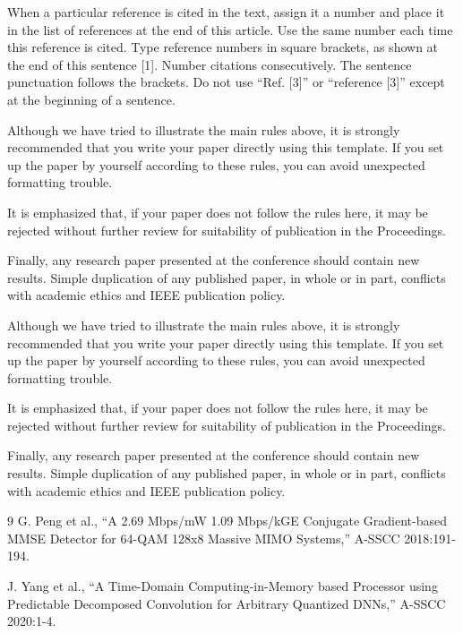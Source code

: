 \documentclass{asscc2026}
\begin{document}
When a particular reference is cited in the text, assign it a number and place it in the list of references at the end of this article. Use the same number each time this reference is cited. Type reference numbers in square brackets, as shown at the end of this sentence [1]. Number citations consecutively. The sentence punctuation follows the brackets. Do not use ``Ref. [3]'' or ``reference [3]'' except at the beginning of a sentence.

Although we have tried to illustrate the main rules above, it is strongly recommended that you write your paper directly using this template. If you set up the paper by yourself according to these rules, you can avoid unexpected formatting trouble.

It is emphasized that, if your paper does not follow the rules here, it may be rejected without further review for suitability of publication in the Proceedings.

Finally, any research paper presented at the conference should contain new results. Simple duplication of any published paper, in whole or in part, conflicts with academic ethics and IEEE publication policy.

Although we have tried to illustrate the main rules above, it is strongly recommended that you write your paper directly using this template. If you set up the paper by yourself according to these rules, you can avoid unexpected formatting trouble.

It is emphasized that, if your paper does not follow the rules here, it may be rejected without further review for suitability of publication in the Proceedings.

Finally, any research paper presented at the conference should contain new results. Simple duplication of any published paper, in whole or in part, conflicts with academic ethics and IEEE publication policy.

\begin{thebibliography}{9}
G. Peng et al., ``A 2.69 Mbps/mW 1.09 Mbps/kGE Conjugate Gradient-based MMSE Detector for 64-QAM 128x8 Massive MIMO Systems,'' A-SSCC 2018:191-194.

J. Yang et al., ``A Time-Domain Computing-in-Memory based Processor using Predictable Decomposed Convolution for Arbitrary Quantized DNNs,'' A-SSCC 2020:1-4.




\end{thebibliography}
\end{document}
